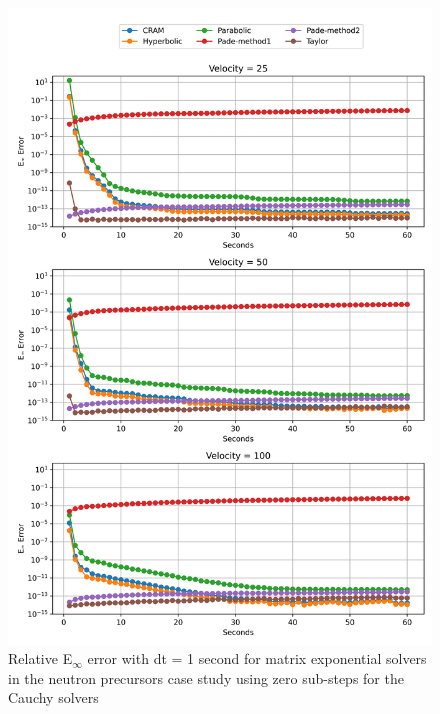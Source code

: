 \clearpage

\begin{figure}[p]
    \centering
    \includegraphics[width=5in]{images/chapter-5/caseStudies/neutronPrecursors/dt1/neutronPrecursorsEinfErrorerrorSteps0.png}
    \caption{Relative E$_{\infty}$ error with dt = 1 second for matrix exponential solvers in the neutron precursors case study using zero sub-steps for the Cauchy solvers}
    \label{fig:neutron_precursors_Einf_steps0}
\end{figure}

\clearpage

